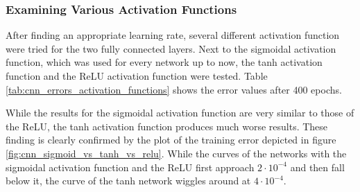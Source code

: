 \documentclass[11pt, a4paper]{article}
\begin{document}
\subsubsection{Examining Various Activation Functions}

After finding an appropriate learning rate, several different activation function were tried for the two fully connected layers. Next to the sigmoidal activation function, which was used for every network up to now, the tanh activation function and the \ac{ReLU} activation function were tested. Table \ref{tab:cnn_errors_activation_functions} shows the error values after 400 epochs.

While the results for the sigmoidal activation function are very similar to those of the \ac{ReLU}, the tanh activation function produces much worse results. These finding is clearly confirmed by the plot of the training error depicted in figure \ref{fig:cnn_sigmoid_vs_tanh_vs_relu}. While the curves of the networks with the sigmoidal activation function and the \ac{ReLU} first approach $2\cdot10^{-4}$ and then fall below it, the curve of the tanh network wiggles around at $4\cdot10^{-4}$.
\end{document}
